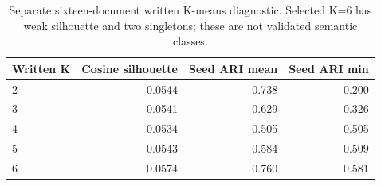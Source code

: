 \begin{table}[t]
\centering\small
\begin{tabular}{lrrr}
\toprule
Written K & Cosine silhouette & Seed ARI mean & Seed ARI min\\
\midrule
2 & 0.0544 & 0.738 & 0.200\\
3 & 0.0541 & 0.629 & 0.326\\
4 & 0.0534 & 0.505 & 0.505\\
5 & 0.0543 & 0.584 & 0.509\\
6 & 0.0574 & 0.760 & 0.581\\
\bottomrule
\end{tabular}
\caption{Separate sixteen-document written K-means diagnostic. Selected K=6 has weak silhouette and two singletons; these are not validated semantic classes.}
\end{table}
